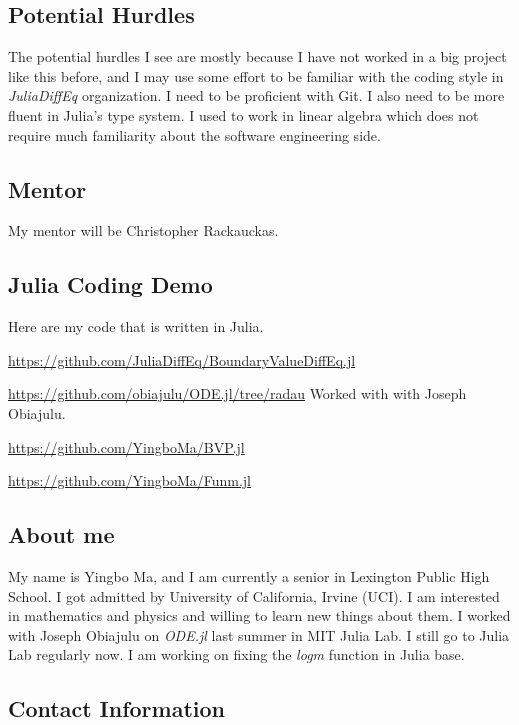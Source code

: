 \documentclass[a4paper,12pt,onecolumn]{article}
\begin{document}
\subsection{Potential Hurdles} %
\label{sub:potential_hurdles}
The potential hurdles I see are mostly because I have not worked in a big project like
this before, and I may use some effort to be familiar with the coding style in \textit{JuliaDiffEq}
organization. I need to be proficient with Git. I also need to be more fluent in Julia's
type system. I used to work in linear algebra which does not require much familiarity
about the software engineering side.

\subsection{Mentor} %
\label{sub:mentor}
My mentor will be Christopher Rackauckas.



\subsection{Julia Coding Demo} %
\label{ssub:julia_coding_demo}
Here are my code that is written in Julia.

\url{https://github.com/JuliaDiffEq/BoundaryValueDiffEq.jl}

\url{https://github.com/obiajulu/ODE.jl/tree/radau} Worked with with Joseph Obiajulu.

\url{https://github.com/YingboMa/BVP.jl}

\url{https://github.com/YingboMa/Funm.jl}

\subsection{About me} %
\label{ssub:about_me}
My name is Yingbo Ma, and I am currently a senior in Lexington Public High School. I got admitted by
University of California, Irvine (UCI). I am interested in mathematics and physics and willing to
learn new things about them. I worked with Joseph Obiajulu on \textit{ODE.jl} last summer in MIT
Julia Lab. I still go to Julia Lab regularly now. I am working on fixing the \textit{logm} function
in Julia base.

\subsection{Contact Information} %
\label{ssub:contact_information}
\end{document}
